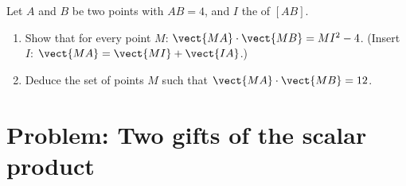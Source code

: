 \begin{exercise}[$\star\star\star$]\label{exo:g11:scal:11}
Let $A$ and $B$ be two points with $AB = 4$, and $I$ the  of
$[AB]$.
\begin{enumerate}
  \item Show that for every point $M$:
        $\vect{MA}\cdot\vect{MB} = MI^2 - 4$.
        (Insert $I$: $\vect{MA} = \vect{MI} + \vect{IA}$.)
  \item Deduce the set of points $M$ such that
        $\vect{MA}\cdot\vect{MB} = 12$.
\end{enumerate}
\end{exercise}

\section{Problem: Two gifts of the scalar product}

